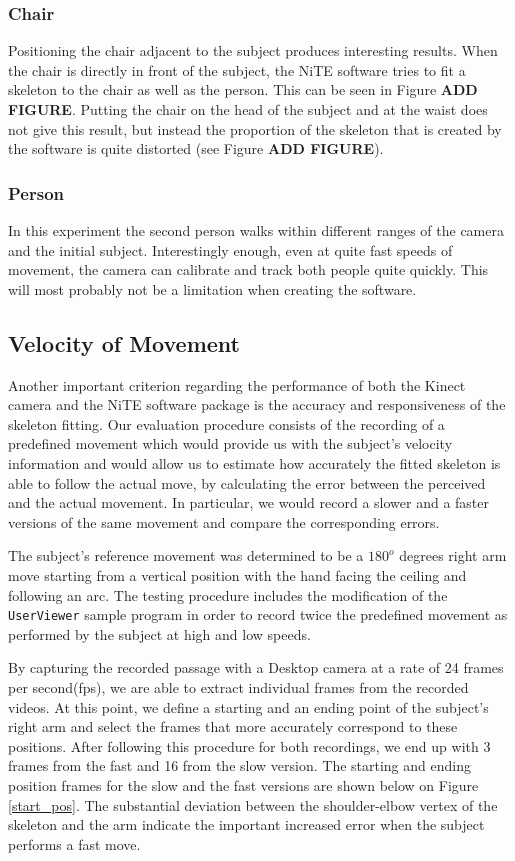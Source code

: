 \documentclass[10pt]{article}
\begin{document}
\subsubsection{Chair}
\noindent Positioning the chair adjacent to the subject produces interesting results. When the chair is directly in front of the subject, the NiTE software tries to fit a skeleton to the chair as well as the person.
This can be seen in Figure \textbf{ADD FIGURE}. Putting the chair on the head of the subject and at the waist does not give this result, but instead the proportion of the skeleton that is created by the software is quite distorted
(see Figure \textbf{ADD FIGURE}). 
\subsubsection{Person}
\noindent
In this experiment the second person walks within different ranges of the camera and the initial subject. Interestingly enough, even at quite fast speeds of movement, the camera can calibrate and track both people quite quickly. This will most probably not be a limitation when creating the software. 
\subsection{Velocity of Movement}
Another important criterion regarding the performance of both the Kinect camera and the NiTE software package is the accuracy and responsiveness of the skeleton fitting. Our evaluation procedure consists of the recording of a predefined movement which would provide us with the subject's velocity information and would allow us to estimate how accurately the fitted skeleton is able to follow the actual move, by calculating the error between the perceived and the actual movement. In particular, we would record a slower and a faster versions of the same movement and compare the corresponding errors.

The subject's reference movement was determined to be a $180^o$ degrees right arm move starting from a vertical position with the hand facing the ceiling and following an arc. The testing procedure includes the modification of the \texttt{UserViewer} sample program in order to record twice the predefined movement as performed by the subject at high and low speeds. 

By capturing the recorded passage with a Desktop camera at a rate of 24 frames per second(fps), we are able to extract individual frames from the recorded videos. At this point, we define a starting and an ending point of the subject's right arm and select the frames that more accurately correspond to these positions. After following this procedure for both recordings, we end up with 3 frames from the fast and 16 from the slow version. The starting and ending position frames for the slow and the fast versions are shown below on Figure \ref{start_pos}. The substantial deviation between the shoulder-elbow vertex of the skeleton and the arm indicate the important increased error when the subject performs a fast move.
\end{document}
